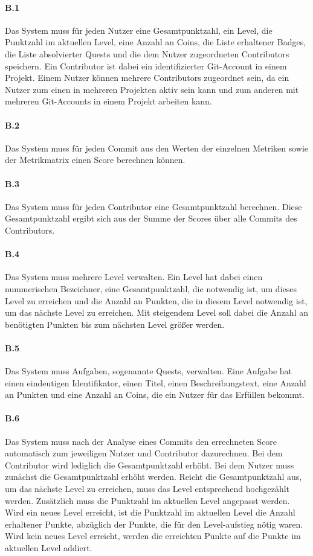 \documentclass[
	oneside,  %
	ngerman, 
	final, 
	11pt, 
	a4paper, 
	1.1headlines, 
	headinclude=false, 
	footinclude=false, 
	mpinclude=false, 
	pagesize, 
	onecolumn, 
	titlepage, 
	parskip=half, 
	headsepline, 
	chapterprefix=false, 
	version=first, 
	listof=totoc, 
	bibliography=totoc, 
	toc=graduated, 
	fleqn
]{scrbook}
\begin{document}
\paragraph{B.1}
Das System muss für jeden Nutzer eine Gesamtpunktzahl, ein Level, die Punktzahl im aktuellen Level, eine Anzahl an Coins, die Liste erhaltener Badges, die Liste absolvierter Quests und die dem Nutzer zugeordneten Contributors speichern.
Ein Contributor ist dabei ein identifizierter Git-Account in einem Projekt.
Einem Nutzer können mehrere Contributors zugeordnet sein, da ein Nutzer zum einen in mehreren Projekten aktiv sein kann und zum anderen mit mehreren Git-Accounts in einem Projekt arbeiten kann.

\paragraph{B.2}
Das System muss für jeden Commit aus den Werten der einzelnen Metriken sowie der Metrikmatrix einen Score berechnen können.

\paragraph{B.3}
Das System muss für jeden Contributor eine Gesamtpunktzahl berechnen.
Diese Gesamtpunktzahl ergibt sich aus der Summe der Scores über alle Commits des Contributors.

\paragraph{B.4}
Das System muss mehrere Level verwalten.
Ein Level hat dabei einen nummerischen Bezeichner, eine Gesamtpunktzahl, die notwendig ist, um dieses Level zu erreichen und die Anzahl an Punkten, die in diesem Level notwendig ist, um das nächste Level zu erreichen.
Mit steigendem Level soll dabei die Anzahl an benötigten Punkten bis zum nächsten Level größer werden.

\paragraph{B.5}
Das System muss Aufgaben, sogenannte Quests, verwalten.
Eine Aufgabe hat einen eindeutigen Identifikator, einen Titel, einen Beschreibungstext, eine Anzahl an Punkten und eine Anzahl an Coins, die ein Nutzer für das Erfüllen bekommt.

\paragraph{B.6}
Das System muss nach der Analyse eines Commits den errechneten Score automatisch zum jeweiligen Nutzer und Contributor dazurechnen.
Bei dem Contributor wird lediglich die Gesamtpunktzahl erhöht.
Bei dem Nutzer muss zunächst die Gesamtpunktzahl erhöht werden.
Reicht die Gesamtpunktzahl aus, um das nächste Level zu erreichen, muss das Level entsprechend hochgezählt werden.
Zusätzlich muss die Punktzahl im aktuellen Level angepasst werden.
Wird ein neues Level erreicht, ist die Punktzahl im aktuellen Level die Anzahl erhaltener Punkte, abzüglich der Punkte, die für den Level-aufstieg nötig waren.
Wird kein neues Level erreicht, werden die erreichten Punkte auf die Punkte im aktuellen Level addiert.
\end{document}
